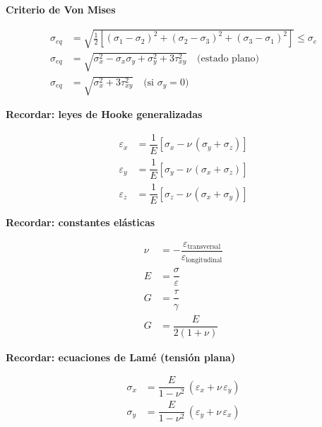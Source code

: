 \documentclass[10pt,a4paper]{article}
\begin{document}
\begin{tcolorbox}[itembox]
\textbf{Criterio de Von Mises}\par
\[
\begin{aligned}\sigma_{eq}&=\sqrt{\tfrac{1}{2}\left[(\sigma_1-\sigma_2)^{2}+(\sigma_2-\sigma_3)^{2}+(\sigma_3-\sigma_1)^{2}\right]}\le\sigma_e\\ \sigma_{eq}&=\sqrt{\sigma_x^{2}-\sigma_x\sigma_y+\sigma_y^{2}+3\tau_{xy}^{2}}\quad\text{(estado plano)}\\ \sigma_{eq}&=\sqrt{\sigma_x^{2}+3\tau_{xy}^{2}}\quad\text{(si }\sigma_y=0\text{)}\end{aligned}
\]
\smallskip{}\par
\end{tcolorbox}

\begin{tcolorbox}[itembox]
\textbf{Recordar: leyes de Hooke generalizadas}\par
\[
\begin{aligned}\varepsilon_x&=\dfrac{1}{E}\left[\sigma_x-\nu\,(\sigma_y+\sigma_z)\right]\\ \varepsilon_y&=\dfrac{1}{E}\left[\sigma_y-\nu\,(\sigma_x+\sigma_z)\right]\\ \varepsilon_z&=\dfrac{1}{E}\left[\sigma_z-\nu\,(\sigma_x+\sigma_y)\right]\end{aligned}
\]
\end{tcolorbox}

\begin{tcolorbox}[itembox]
\textbf{Recordar: constantes elásticas}\par
\[
\begin{aligned}\nu&=-\dfrac{\varepsilon_{\text{transversal}}}{\varepsilon_{\text{longitudinal}}}\\ E&=\dfrac{\sigma}{\varepsilon}\\ G&=\dfrac{\tau}{\gamma}\\ G&=\dfrac{E}{2(1+\nu)}\end{aligned}
\]
\end{tcolorbox}

\begin{tcolorbox}[itembox]
\textbf{Recordar: ecuaciones de Lamé (tensión plana)}\par
\[
\begin{aligned}\sigma_x&=\dfrac{E}{1-\nu^{2}}\,(\varepsilon_x+\nu\,\varepsilon_y)\\ \sigma_y&=\dfrac{E}{1-\nu^{2}}\,(\varepsilon_y+\nu\,\varepsilon_x)\end{aligned}
\]
\end{tcolorbox}
\end{document}
